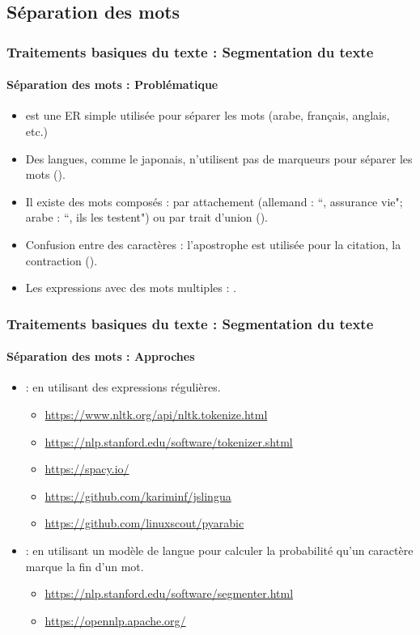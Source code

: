 \documentclass[xcolor=table]{beamer}
\begin{document}
\subsection{Séparation des mots}

\begin{frame}
\frametitle{Traitements basiques du texte : Segmentation du texte}
\framesubtitle{Séparation des mots : Problématique}


\begin{itemize}
	\item \expword{/[ ]+/} est une ER simple utilisée pour séparer les mots (arabe, français, anglais, etc.)
	\item Des langues, comme le japonais, n'utilisent pas de marqueurs pour séparer les mots ().
	\item Il existe des mots composés : par attachement (allemand : ``, assurance vie"; arabe : ``, ils les testent") ou par trait d'union ().
	\item Confusion entre des caractères : l'apostrophe est utilisée pour la citation, la contraction ().
	\item Les expressions avec des mots multiples : .
\end{itemize}

\end{frame}

\begin{frame}
\frametitle{Traitements basiques du texte : Segmentation du texte}
\framesubtitle{Séparation des mots : Approches}

\begin{itemize}
	\item {} : en utilisant des expressions régulières.
	\begin{itemize}
		\item \url{https://www.nltk.org/api/nltk.tokenize.html}
		\item \url{https://nlp.stanford.edu/software/tokenizer.shtml}
		\item \url{https://spacy.io/}
		\item \url{https://github.com/kariminf/jslingua}
		\item \url{https://github.com/linuxscout/pyarabic}
	\end{itemize}
	\item {} : en utilisant un modèle de langue pour calculer la probabilité qu'un caractère marque la  fin d'un mot.
	\begin{itemize}
		\item \url{https://nlp.stanford.edu/software/segmenter.html}
		\item \url{https://opennlp.apache.org/}
	\end{itemize}
\end{itemize}

\end{frame}
\end{document}
